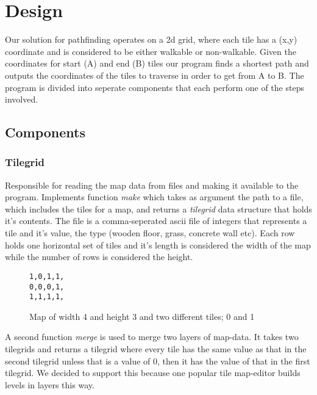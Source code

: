 \documentclass[12pt, a4paper]{article}
\begin{document}






\section{Design}
Our solution for pathfinding operates on a 2d grid, where each tile has a (x,y) coordinate and is considered to be either walkable or non-walkable. Given the coordinates for start (A) and end (B) tiles our program finds a shortest path and outputs the coordinates of the tiles to traverse in order to get from A to B. The program is divided into seperate components that each perform one of the steps involved.

\subsection{Components}
\subsubsection{Tilegrid}

Responsible for reading the map data from files and making it available to the program. Implements function \textit{make} which takes as argument the path to a file, which includes the tiles for a map, and returns a \textit{tilegrid} data structure that holds it's contents. The file is a comma-seperated ascii file of integers that represents a tile and it's value, the type (wooden floor, grass, concrete wall etc). Each row holds one horizontal set of tiles and it's length is considered the width of the map while the number of rows is considered the height.
\begin{figure}[htbp]
\centering
\texttt{1,0,1,1,\\
0,0,0,1,\\
1,1,1,1,\\
}
\caption{Map of width 4 and height 3 and two different tiles; 0 and 1}
\end{figure}

A second function \textit{merge} is used to merge two layers of map-data. It takes two tilegrids and returns a tilegrid where every tile has the same value as that in the second tilegrid unless that is a value of 0, then it has the value of that in the first tilegrid. We decided to support this because one popular tile map-editor\cite{mapeditor} builds levels in layers this way.
\end{document}
